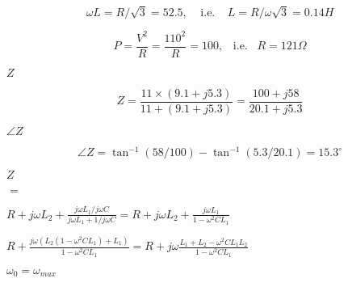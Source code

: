 {\newpage\clearpage
{}%
\begin{displaymath} \omega L=R/\sqrt{3}=52.5,\;\;\;\;\mbox{i.e.}\;\;\;\;
 	L=R/\omega \sqrt{3}=0.14H	\end{displaymath}%
\lthtmldisplayZ
\lthtmlcheckvsize\clearpage}

{\newpage\clearpage
{}%
\begin{displaymath} P=\frac{V^2}{R}=\frac{110^2}{R}=100,\;\;\;\mbox{i.e.}\;\;\;R=121\Omega \end{displaymath}%
\lthtmldisplayZ
\lthtmlcheckvsize\clearpage}

{\newpage\clearpage
{}%
$Z$%
\lthtmlinlinemathZ
\lthtmlcheckvsize\clearpage}

{\newpage\clearpage
{}%
\begin{displaymath} Z=\frac{11\times (9.1+j5.3)}{11+(9.1+j5.3)}=\frac{100+j58}{20.1+j5.3} \end{displaymath}%
\lthtmldisplayZ
\lthtmlcheckvsize\clearpage}

{\newpage\clearpage
{}%
$\angle Z$%
\lthtmlinlinemathZ
\lthtmlcheckvsize\clearpage}

{\newpage\clearpage
{}%
\begin{displaymath} \angle Z=\tan^{-1} (58/100)-\tan^{-1} (5.3/20.1)=15.3^\circ \end{displaymath}%
\lthtmldisplayZ
\lthtmlcheckvsize\clearpage}

{\newpage\clearpage
{}%
$\displaystyle Z$%
\lthtmlindisplaymathZ
\lthtmlcheckvsize\clearpage}

{\newpage\clearpage
{}%
$\textstyle =$%
\lthtmlindisplaymathZ
\lthtmlcheckvsize\clearpage}

{\newpage\clearpage
{}%
$\displaystyle R+j\omega L_2+\frac{j\omega L_1/j\omega C}{j\omega L_1+1/j\omega C}
=R+j\omega L_2+\frac{j\omega L_1}{1-\omega^2 CL_1}$%
\lthtmlindisplaymathZ
\lthtmlcheckvsize\clearpage}

{\newpage\clearpage
{}%
$\displaystyle R+\frac{j\omega(L_2(1-\omega^2CL_1)+L_1)}{1-\omega^2 CL_1}
=R+j\omega \frac{L_1+L_2-\omega^2CL_1L_2}{1-\omega^2CL_1}$%
\lthtmlindisplaymathZ
\lthtmlcheckvsize\clearpage}

{\newpage\clearpage
{}%
$\omega_0=\omega_{max}$%
\lthtmlinlinemathZ
\lthtmlcheckvsize\clearpage}

